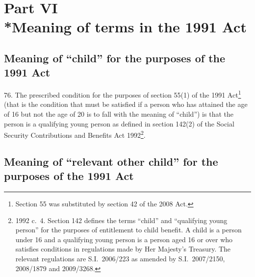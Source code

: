 \documentclass[12pt,a4paper]{article}
\begin{document}

\section[Part VI --- Meaning of terms in the 1991 Act]{Part VI\\*Meaning of terms in the 1991 Act}

\subsection[76. Meaning of “child” for the purposes of the 1991 Act]{Meaning of “child” for the purposes of the 1991 Act}

76.  The prescribed condition for the purposes of section 55(1) of the 1991 Act\footnote{Section 55 was substituted by section 42 of the 2008 Act.} (that is the condition that must be satisfied if a person who has attained the age of 16 but not the age of 20 is to fall with the meaning of “child”) is that the person is a qualifying young person as defined in section 142(2) of the Social Security Contributions and Benefits Act 1992\footnote{1992 c.~4. Section 142 defines the terms “child” and “qualifying young person” for the purposes of entitlement to child benefit. A child is a person under 16 and a qualifying young person is a person aged 16 or over who satisfies conditions in regulations made by Her Majesty’s Treasury. The relevant regulations are S.I.~2006/223 as amended by S.I.~2007/2150, 2008/1879 and 2009/3268.}.

\subsection[77. 
Meaning of “relevant other child” for the purposes of the 1991 Act%
]{%
Meaning of “relevant other child” for the purposes of the 1991 Act%
}
\end{document}
